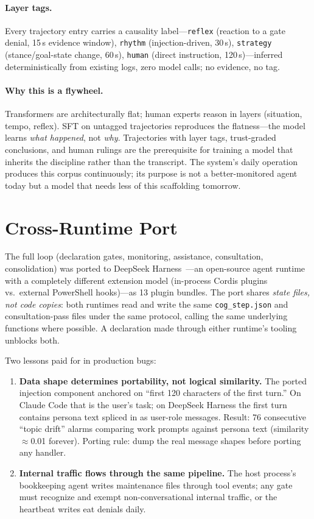 \documentclass{article}
\begin{document}
\paragraph{Layer tags.} Every trajectory entry carries a causality label---\texttt{reflex} (reaction to a gate denial, 15\,s evidence window), \texttt{rhythm} (injection-driven, 30\,s), \texttt{strategy} (stance/goal-state change, 60\,s), \texttt{human} (direct instruction, 120\,s)---inferred deterministically from existing logs, zero model calls; no evidence, no tag.

\paragraph{Why this is a flywheel.} Transformers are architecturally flat; human experts reason in layers (situation, tempo, reflex). SFT on untagged trajectories reproduces the flatness---the model learns \emph{what happened}, not \emph{why}. Trajectories with layer tags, trust-graded conclusions, and human rulings are the prerequisite for training a model that inherits the discipline rather than the transcript. The system's daily operation produces this corpus continuously; its purpose is not a better-monitored agent today but a model that needs less of this scaffolding tomorrow.

\section{Cross-Runtime Port}\label{sec:xrt}

The full loop (declaration gates, monitoring, assistance, consultation, consolidation) was ported to DeepSeek Harness~\cite{dsh}---an open-source agent runtime with a completely different extension model (in-process Cordis plugins vs.\ external PowerShell hooks)---as 13 plugin bundles. The port shares \emph{state files, not code copies}: both runtimes read and write the same \texttt{cog\_step.json} and consultation-pass files under the same protocol, calling the same underlying functions where possible. A declaration made through either runtime's tooling unblocks both.

Two lessons paid for in production bugs:

\begin{enumerate}[leftmargin=*,itemsep=1pt]
\item \textbf{Data shape determines portability, not logical similarity.} The ported injection component anchored on ``first 120 characters of the first turn.'' On Claude Code that is the user's task; on DeepSeek Harness the first turn contains persona text spliced in as user-role messages. Result: 76 consecutive ``topic drift'' alarms comparing work prompts against persona text (similarity $\approx$0.01 forever). Porting rule: dump the real message shapes before porting any handler.
\item \textbf{Internal traffic flows through the same pipeline.} The host process's bookkeeping agent writes maintenance files through tool events; any gate must recognize and exempt non-conversational internal traffic, or the heartbeat writes eat denials daily.
\end{enumerate}
\end{document}
